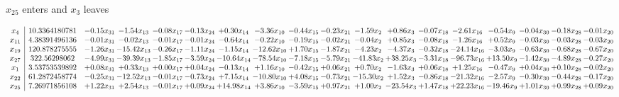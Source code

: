\documentclass[9pt]{article}
\begin{document}
 $ x_{25} $ enters and $ x_{3} $ leaves 

 \[\begin{array}{c| c c@{\hskip 2pt} c@{\hskip 2pt} c@{\hskip 2pt} c@{\hskip 2pt} c@{\hskip 2pt} c@{\hskip 2pt} c@{\hskip 2pt} c@{\hskip 2pt} c@{\hskip 2pt} c@{\hskip 2pt} c@{\hskip 2pt} c@{\hskip 2pt} c@{\hskip 2pt} c@{\hskip 2pt} c@{\hskip 2pt} c@{\hskip 2pt} }
 x_{4}   &  10.3364180781 & -0.15 x_{31} & -1.54 x_{13} & -0.08 x_{17} & -0.13 x_{24} & +  0.30 x_{14} & -3.36 x_{10} & -0.44 x_{15} & -0.23 x_{21} & -1.59 x_{2} & +  0.86 x_{3} & -0.07 x_{18} & -2.61 x_{16} & -0.54 x_{9} & -0.04 x_{30} & -0.18 x_{28} & -0.01 x_{20}\\
 x_{11}   &  4.38391496136 & -0.01 x_{31} & -0.02 x_{13} & -0.01 x_{17} & -0.01 x_{24} & -0.64 x_{14} & -0.22 x_{10} & -0.19 x_{15} & -0.02 x_{21} & -0.04 x_{2} & +  0.85 x_{3} & -0.08 x_{18} & -1.26 x_{16} & +  0.52 x_{9} & -0.03 x_{30} & -0.03 x_{28} & -0.03 x_{20}\\
 x_{19}   &  120.878275555 & -1.26 x_{31} & -15.42 x_{13} & -0.26 x_{17} & -1.11 x_{24} & -1.15 x_{14} & -12.62 x_{10} & +  1.70 x_{15} & -1.87 x_{21} & -4.23 x_{2} & -4.37 x_{3} & -0.32 x_{18} & -24.14 x_{16} & -3.03 x_{9} & -0.63 x_{30} & -0.68 x_{28} & -0.67 x_{20}\\
 x_{27}   &  322.56298062 & -4.99 x_{31} & -39.39 x_{13} & -1.85 x_{17} & -3.59 x_{24} & -10.64 x_{14} & -78.54 x_{10} & -7.18 x_{15} & -5.79 x_{21} & -41.83 x_{2} & + 38.25 x_{3} & -3.31 x_{18} & -96.73 x_{16} & + 13.50 x_{9} & -1.42 x_{30} & -4.89 x_{28} & -0.27 x_{20}\\
 x_{1}   &  3.53753539892 & +  0.08 x_{31} & +  0.33 x_{13} & +  0.00 x_{17} & +  0.04 x_{24} & -0.13 x_{14} & +  1.16 x_{10} & -0.42 x_{15} & +  0.06 x_{21} & +  0.70 x_{2} & -1.63 x_{3} & +  0.06 x_{18} & +  1.25 x_{16} & -0.47 x_{9} & +  0.04 x_{30} & +  0.10 x_{28} & -0.02 x_{20}\\
 x_{22}   &  61.2872458774 & -0.25 x_{31} & -12.52 x_{13} & -0.01 x_{17} & -0.73 x_{24} & +  7.15 x_{14} & -10.80 x_{10} & +  4.08 x_{15} & -0.73 x_{21} & -15.30 x_{2} & +  1.52 x_{3} & -0.86 x_{18} & -21.32 x_{16} & -2.57 x_{9} & -0.30 x_{30} & -0.44 x_{28} & -0.17 x_{20}\\
 x_{25}   &  7.26971856108 & +  1.22 x_{31} & +  2.54 x_{13} & -0.01 x_{17} & +  0.09 x_{24} & + 14.98 x_{14} & +  3.86 x_{10} & -3.59 x_{15} & +  0.97 x_{21} & +  1.00 x_{2} & -23.54 x_{3} & +  1.47 x_{18} & + 22.23 x_{16} & -19.46 x_{9} & +  1.01 x_{30} & +  0.99 x_{28} & +  0.09 x_{20}\\

\end{array}\]
\end{document}
